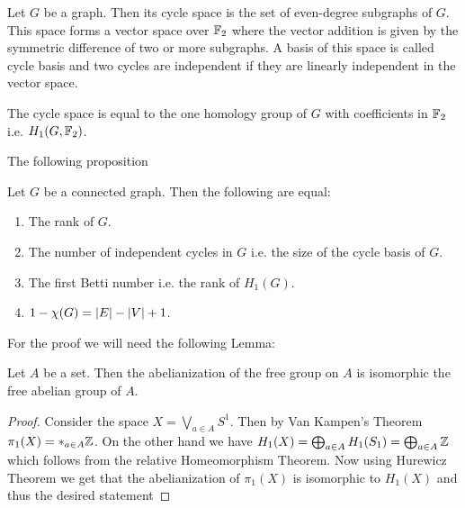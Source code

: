 \begin{definition}
	Let $G$ be a graph. Then its cycle space is the set of even-degree subgraphs of $G$. 
	This space forms a vector space over $\mathbb{F}_2$ where the vector addition is given by the symmetric difference of two or more subgraphs.
	A basis of this space is called cycle basis and two cycles are independent if they are linearly independent in the vector space.
\end{definition}

\begin{remark}
	The cycle space is equal to the one homology group of $G$ with coefficients in $\mathbb{F}_2$ i.e. $H_1(G,\mathbb{F}_2)$.
\end{remark}

The following proposition 
\begin{proposition}\label{prop:rank}
	Let $G$ be a connected graph. Then the following are equal:
	\begin{enumerate}
		\item The rank of $G$.
		\item The number of independent cycles in $G$ i.e. the size of the cycle basis of $G$.
		\item The first Betti number i.e. the rank of $H_{1}(G)$.
		\item $1 - \chi(G) = \abs{E} - \abs{V} + 1$.
	\end{enumerate}
\end{proposition}

For the proof we will need the following Lemma:
\begin{lemma}
	Let $A$ be a set. Then the abelianization of the free group on $A$ is isomorphic the free abelian group of $A$.
\end{lemma}

\begin{proof}
	Consider the space $X = \bigvee_{a \in A} S^{1}$. Then by Van Kampen's Theorem $\pi_1(X) = *_{a \in A} \mathbb{Z}$.
	On the other hand we have $H_1(X) = \bigoplus_{a \in A} H_1(S_1) = \bigoplus_{a \in A} \mathbb{Z}$ which follows from the relative Homeomorphism Theorem.
	Now using Hurewicz Theorem we get that the abelianization of $\pi_1(X)$ is isomorphic to $H_1(X)$ and thus the desired statement
\end{proof}

